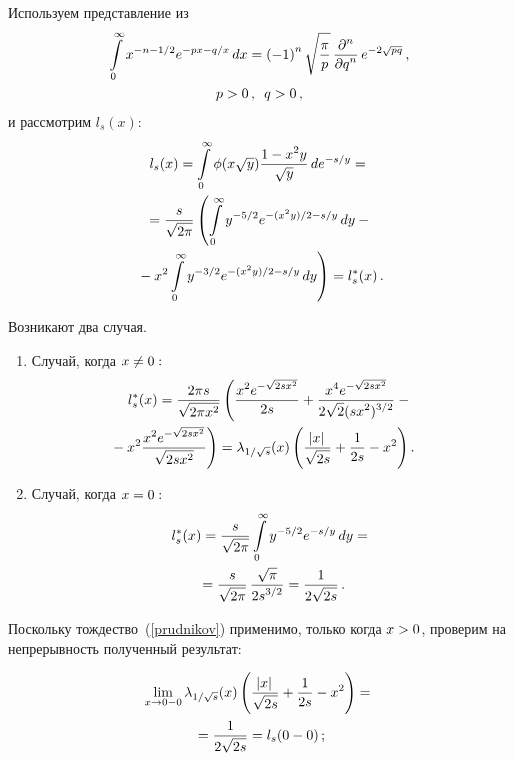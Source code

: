 \begin{multicols}{2}
Используем представление из~\cite{Prudnikov}  
\begin{multline}
\label{prudnikov}
 \int\limits^{\infty}_{0}x^{-n-{1}/{2}}e^{-px-{q}/{x}}\,dx = 
 \left(-1\right)^n \sqrt{\displaystyle\frac{\displaystyle \pi\mathstrut}{\displaystyle p\mathstrut}}\,\displaystyle\frac{\displaystyle \partial^n\mathstrut}{\displaystyle \partial q^n\mathstrut}
 \,e^{-2\sqrt{pq}}\,,\\
p>0\,,\enskip q>0\,,
\end{multline}
и рассмотрим $l_{s}(x)$: \\
\begin{multline*}
 l_{s}(x)= \int\limits^{\infty}_{0}\phi(x\sqrt{y})
 \displaystyle\frac{\displaystyle 1-x^{2}y\mathstrut}{\displaystyle \sqrt{y}\mathstrut}\,de^{-s/y} ={}\\
{}= \displaystyle\frac{\displaystyle s\mathstrut}{\displaystyle \sqrt{2\pi}\mathstrut}\left( \int\limits^{\infty}_{0}y^{-{5}/{2}}
e^{-({x^{2}y})/{2}-{s}/{y}}\,dy - {}\right.\\
\left.{}-
x^2\int\limits^{\infty}_{0}y^{-{3}/{2}}e^{-({x^{2}y})/{2}-{s}/{y}}\,dy   \right)
=l_{s}^{*}(x)\,.
\end{multline*}

Возникают два случая.
\begin{enumerate}[1.]
\item Случай, когда $ x \hm\neq 0:$ 
\begin{multline*}
\hspace*{-1.14159pt} l_{s}^{*}(x)=\fr{2\pi s}{\sqrt{2\pi x^2}}  
 \left( \fr{x^{2}e^{-\sqrt{2sx^2}}}{2s}+\fr{x^{4}e^{-\sqrt{2sx^2}}}{2\sqrt{2}
 (sx^2)^{{3}/{2}}}-{}\right.\\
\hspace*{-16pt}\left. {}-x^{2}\fr{x^{2}e^{-\sqrt{2sx^2}}}{\sqrt{2sx^2}}\right) =
\lambda_{1/\sqrt{s}}(x)\left( \fr{\left|x\right|}{\sqrt{2s}}+\fr{1}{2s}-x^2\right).\hspace*{-1.23863pt} 
\end{multline*}
\item Случай, когда $x \hm= 0:$
\begin{multline*}
l_{s}^{*}(x)= \displaystyle\frac{\displaystyle s\mathstrut}{\displaystyle \sqrt{2\pi}\mathstrut} \int\limits^{\infty}_{0}
y^{-{5}/{2}}e^{-{s}/{y}}\,dy = {}\\
{}=\displaystyle\frac{\displaystyle s\mathstrut}{\displaystyle \sqrt{2\pi}\mathstrut}\,
\displaystyle\frac{\displaystyle \sqrt{\pi}\mathstrut}{\displaystyle 2s^{{3}/{2}}\mathstrut} = \displaystyle\frac{\displaystyle 1\mathstrut}{\displaystyle 2\sqrt{2s}\mathstrut}\,.
\end{multline*}
\end{enumerate}
Поскольку тождество~(\ref{prudnikov}) применимо, только когда $x\hm>0$, проверим 
на непрерывность полученный результат:

\noindent
\begin{multline*}
 \lim\limits_{x\rightarrow 0-0}\lambda_{1/\sqrt{s}}(x)\left( \displaystyle\frac{\displaystyle \left|x\right|\mathstrut}{\displaystyle \sqrt{2s}\mathstrut}+\displaystyle\frac{\displaystyle 1\mathstrut}{\displaystyle 2s\mathstrut}-x^2\right) ={}\\
 {}= \displaystyle\frac{\displaystyle 1\mathstrut}{\displaystyle 2\sqrt{2s}\mathstrut}
  = l_s(0-0)\,;
  \end{multline*}
  

\end{multicols}

